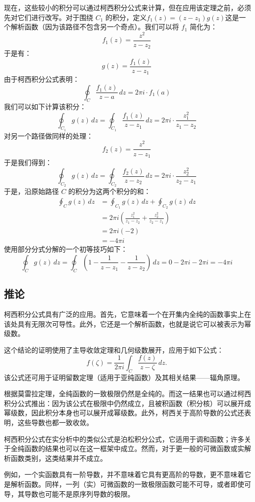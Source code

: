 现在，这些较小的积分可以通过柯西积分公式来计算，但在应用该定理之前，必须先对它们进行改写。对于围绕 $C_1$ 的积分，定义$ f_1(z) = (z - z_1)g(z)$这是一个解析函数（因为该路径不包含另一个奇点）。我们可以将 $f_1$ 简化为：
$$
f_1(z) = \frac{z^2}{z - z_2}~
$$
于是有：
$$
g(z) = \frac{f_1(z)}{z - z_1}~
$$
由于柯西积分公式表明：
$$
\oint_C \frac{f_1(z)}{z - a} \, dz = 2\pi i \cdot f_1(a)~
$$
我们可以如下计算该积分：
$$
\oint_{C_1} g(z) \, dz = \oint_{C_1} \frac{f_1(z)}{z - z_1} \, dz = 2\pi i \cdot \frac{z_1^2}{z_1 - z_2}~
$$
对另一个路径做同样的处理：
$$
f_2(z) = \frac{z^2}{z - z_1}~
$$
于是我们得到：
$$
\oint_{C_2} g(z) \, dz = \oint_{C_2} \frac{f_2(z)}{z - z_2} \, dz = 2\pi i \cdot \frac{z_2^2}{z_2 - z_1}~
$$
于是，沿原始路径 $C$ 的积分为这两个积分的和：
$$
\begin{aligned}
\oint_C g(z) \,dz 
&= \oint_{C_1} g(z) \,dz + \oint_{C_2} g(z) \,dz \\
&= 2\pi i \left( \frac{z_1^2}{z_1 - z_2} + \frac{z_2^2}{z_2 - z_1} \right) \\
&= 2\pi i (-2) \\
&= -4\pi i
\end{aligned}~
$$
使用部分分式分解的一个初等技巧如下：
$$
\oint_C g(z) \,dz = \oint_C \left(1 - \frac{1}{z - z_1} - \frac{1}{z - z_2} \right) \,dz = 0 - 2\pi i - 2\pi i = -4\pi i~
$$
\subsection{推论}
柯西积分公式具有广泛的应用。首先，它意味着一个在开集内全纯的函数事实上在该处具有无限次可导性。此外，它还是一个解析函数，也就是说它可以被表示为幂级数。

这个结论的证明使用了主导收敛定理和几何级数展开，应用于如下公式：
$$
f(\zeta) = \frac{1}{2\pi i} \int_C \frac{f(z)}{z - \zeta} \, dz.~
$$
该公式还可用于证明留数定理（适用于亚纯函数）及其相关结果——辐角原理。

根据莫雷拉定理，全纯函数的一致极限仍然是全纯的。而这一结果也可以通过柯西积分公式推出：因为该公式在极限中仍然成立，且被积函数（积分核）可以展开成幂级数，因此积分本身也可以展开成幂级数。此外，柯西关于高阶导数的公式还表明，这些导数也都一致收敛。

柯西积分公式在实分析中的类似公式是泊松积分公式，它适用于调和函数；许多关于全纯函数的结果也可以在这一框架中成立。然而，对于更一般的可微函数或实解析函数类别，这类结果并不成立。

例如，一个实函数具有一阶导数，并不意味着它具有更高阶的导数，更不意味着它是解析函数。同样，一列（实）可微函数的一致极限函数可能不可导，或者即使可导，其导数也可能不是原序列导数的极限。

